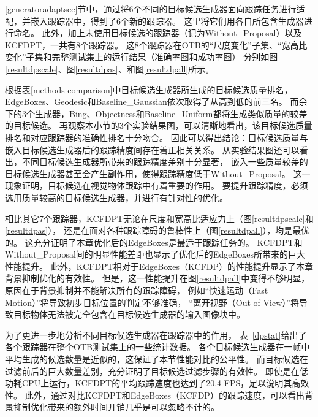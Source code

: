 \ref{generatoradaptsec}节中，通过将6个不同的目标候选生成器面向跟踪任务进行适配，并嵌入跟踪器中，得到了6个新的跟踪器。
这里将它们用各自所包含生成器进行命名。
此外，加上未使用目标候选的跟踪器（记为Without\_Proposal）以及KCFDPT，一共有8个跟踪器。
这8个跟踪器在OTB的``尺度变化''子集、``宽高比变化''子集和完整测试集上的运行结果（准确率图和成功率图）
分别如图\ref{resultdpscale}、图\ref{resultdpas}、和图\ref{resultdpall}所示。

根据表\ref{methods-comparison}中目标候选生成器所生成的目标候选质量排名，
EdgeBoxes、Geodesic和Baseline\_Gaussian依次取得了从高到低的前三名。
而余下的3个生成器，Bing、Objectness和Baseline\_Uniform都将生成类似质量的较差的目标候选。
再观察本小节的3个实验结果图，可以清晰地看出，该目标候选质量排名和对应跟踪器的准确性排名十分吻合。
因此可以得出结论：目标候选质量与嵌入目标候选生成器后的跟踪精度间存在着正相关关系。
从实验结果图还可以看出，不同目标候选生成器所带来的跟踪精度差别十分显著，
嵌入一些质量较差的目标候选生成器甚至会产生副作用，使得跟踪精度低于Without\_Proposal。
这一现象证明，目标候选在视觉物体跟踪中有着重要的作用。
要提升跟踪精度，必须选用质量较高的目标候选生成器，并进行有针对性的优化。

相比其它7个跟踪器，KCFDPT无论在尺度和宽高比适应力上（图\ref{resultdpscale}和\ref{resultdpas}），
还是在面对各种跟踪障碍的鲁棒性上（图\ref{resultdpall}），均是最优的。
这充分证明了本章优化后的EdgeBoxes是最适于跟踪任务的。
KCFDPT和Without\_Proposal间的明显性能差距也显示了优化后的EdgeBoxes所带来的巨大性能提升。
此外，KCFDPT相对于EdgeBoxes（KCFDP）的性能提升显示了本章背景抑制优化的有效性。
但是，这一性能提升在图\ref{resultdpall}中变得不够明显，原因在于背景抑制并不能解决所有的跟踪障碍，
例如``快速运动（Fast Motion）''将导致初步目标位置的判定不够准确，
``离开视野（Out of View）''将导致目标物体无法被完全包含在目标候选生成器的输入图像块中。

为了更进一步地分析不同目标候选生成器在跟踪器中的作用，
表~\ref{dpstat}给出了各个跟踪器在整个OTB测试集上的一些统计数据。
各个目标候选生成器在一帧中平均生成的候选数量是近似的，这保证了本节性能对比的公平性。
而目标候选在过滤前后的巨大数量差别，充分证明了目标候选过滤步骤的有效性。
即使是在低功耗CPU上运行，KCFDPT的平均跟踪速度也达到了20.4 FPS，足以说明其高效性。
此外，通过对比KCFDPT和EdgeBoxes（KCFDP）的跟踪速度，可以看出背景抑制优化带来的额外时间开销几乎是可以忽略不计的。

